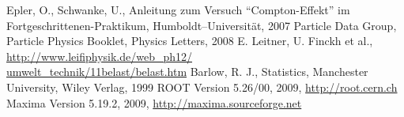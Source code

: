 \renewcommand{\refname}{Literatur und Programme}
\begin{thebibliography}{xxxxxx}
Epler, O., Schwanke, U., Anleitung zum Versuch ``Compton-Effekt'' im
Fortgeschrittenen-Praktikum, Humboldt–Universität, 2007
Particle Data Group, Particle Physics Booklet, Physics Letters, 2008
E. Leitner, U. Finckh et al.,\\
\href{http://www.leifiphysik.de/web_ph12/umwelt_technik/11belast/belast.htm}{
http://www.leifiphysik.de/web\_ph12/\\umwelt\_technik/11belast/belast.htm}
Barlow, R. J., Statistics, Manchester University, Wiley Verlag, 1999
ROOT Version 5.26/00, 2009, \href{http://root.cern.ch}{http://root.cern.ch}
Maxima Version 5.19.2, 2009, \href{http://maxima.sourceforge.net}{http://maxima.sourceforge.net}
\end{thebibliography}